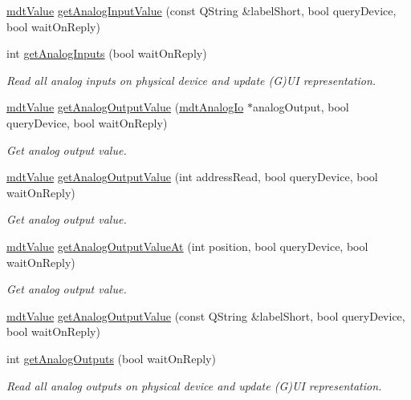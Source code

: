 \begin{DoxyCompactItemize}
\hyperlink{classmdt_value}{mdt\-Value} \hyperlink{classmdt_device_a66a4c466dd6cb5c8235850f6dc23ae7b}{get\-Analog\-Input\-Value} (const Q\-String \&label\-Short, bool query\-Device, bool wait\-On\-Reply)
\item 
int \hyperlink{classmdt_device_a98cba3132db15317daf54eb701388e91}{get\-Analog\-Inputs} (bool wait\-On\-Reply)
\begin{DoxyCompactList}\small\item\em Read all analog inputs on physical device and update (G)U\-I representation. \end{DoxyCompactList}\item 
\hyperlink{classmdt_value}{mdt\-Value} \hyperlink{classmdt_device_a163ee286d905feafe50b3e4351d4bf41}{get\-Analog\-Output\-Value} (\hyperlink{classmdt_analog_io}{mdt\-Analog\-Io} $\ast$analog\-Output, bool query\-Device, bool wait\-On\-Reply)
\begin{DoxyCompactList}\small\item\em Get analog output value. \end{DoxyCompactList}\item 
\hyperlink{classmdt_value}{mdt\-Value} \hyperlink{classmdt_device_aa90eb1111d6778f4227224d3b1804ae7}{get\-Analog\-Output\-Value} (int address\-Read, bool query\-Device, bool wait\-On\-Reply)
\begin{DoxyCompactList}\small\item\em Get analog output value. \end{DoxyCompactList}\item 
\hyperlink{classmdt_value}{mdt\-Value} \hyperlink{classmdt_device_ae3776f8a9215c799781e701798927f0c}{get\-Analog\-Output\-Value\-At} (int position, bool query\-Device, bool wait\-On\-Reply)
\begin{DoxyCompactList}\small\item\em Get analog output value. \end{DoxyCompactList}\item 
\hyperlink{classmdt_value}{mdt\-Value} \hyperlink{classmdt_device_ad6bfbab4c93bc0136068e773dd776010}{get\-Analog\-Output\-Value} (const Q\-String \&label\-Short, bool query\-Device, bool wait\-On\-Reply)
\item 
int \hyperlink{classmdt_device_a78a8968cf61c1cac518b0a8af471110c}{get\-Analog\-Outputs} (bool wait\-On\-Reply)
\begin{DoxyCompactList}\small\item\em Read all analog outputs on physical device and update (G)U\-I representation. \end{DoxyCompactList}\item 

\end{DoxyCompactItemize}
